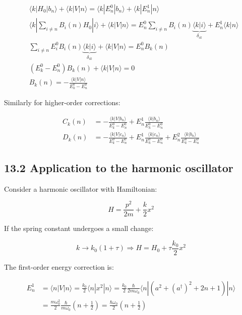 \documentclass[10pt]{article}
\begin{document}
\begin{align*}
&\langle k|H_0|b_n\rangle+\langle k|V|n\rangle=\langle k|E_n^0|b_n\rangle+\langle k|E_n^1|n\rangle\\
&\langle k|\sum_{i\neq n}B_i(n)H_0|i\rangle+\langle k|V|n\rangle=E_n^0\sum_{i\neq n}B_i(n)\underbrace{\langle k|i\rangle}_{\delta_{ik}}+E_n^1\langle k|n\rangle\\
&\sum_{i\neq n}E_i^0B_i(n)\underbrace{\langle k|i\rangle}_{\delta_{ik}}+\langle k|V|n\rangle=E_n^0B_k(n) \tag{13.17}\\
&(E_k^0-E_n^0)B_k(n)+\langle k|V|n\rangle=0\\
&B_k(n)=-\frac{\langle k|V|n\rangle}{E_k^0-E_n^0}
\end{align*}

Similarly for higher-order corrections:

\begin{align*}
C_k(n)&=-\frac{\langle k|V|b_n\rangle}{E_k^0-E_n^0}+E_n^1\frac{\langle k|b_n\rangle}{E_k^0-E_n^0} \tag{13.18}\\
D_k(n)&=-\frac{\langle k|V|c_n\rangle}{E_k^0-E_n^0}+E_n^1\frac{\langle k|c_n\rangle}{E_k^0-E_n^0}+E_n^2\frac{\langle k|b_n\rangle}{E_k^0-E_n^0}
\end{align*}

\subsection*{13.2 Application to the harmonic oscillator}
Consider a harmonic oscillator with Hamiltonian:

\begin{equation*}
H=\frac{p^2}{2m}+\frac{k}{2}x^2 \tag{13.19}
\end{equation*}

If the spring constant undergoes a small change:

\begin{equation*}
k\rightarrow k_0(1+\tau)\Rightarrow H=H_0+\tau\frac{k_0}{2}x^2 \tag{13.20}
\end{equation*}

The first-order energy correction is:

\begin{align*}
E_n^1&=\langle n|V|n\rangle=\frac{k_0}{2}\langle n|x^2|n\rangle=\frac{k_0}{2}\frac{\hbar}{2m\omega_0}\langle n|(a^2+(a^\dagger)^2+2n+1)|n\rangle\\
&=\frac{m\omega_0^2}{2}\frac{\hbar}{m\omega_0}(n+\frac{1}{2})=\frac{\hbar\omega_0}{2}(n+\frac{1}{2}) \tag{13.21}
\end{align*}
\end{document}
